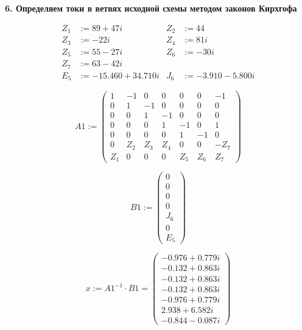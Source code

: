 \documentclass{article}
\begin{document}
\textbf{6. Определяем токи в ветвях исходной схемы методом законов Кирхгофа}

\begin{align*}
Z_1 &:= 89 + 47i & Z_2 &:= 44 \\
Z_3 &:= -22i & Z_4 &:= 81i \\
Z_5 &:= 55 - 27i & Z_6 &:= -30i \\
Z_7 &:= 63 - 42i \\
E_5 &:= -15.460 + 34.710i & J_6 &:= -3.910 - 5.800i
\end{align*}

\[
A1 := \begin{pmatrix} 
1 & -1 & 0 & 0 & 0 & 0 & -1 \\ 
0 & 1 & -1 & 0 & 0 & 0 & 0 \\ 
0 & 0 & 1 & -1 & 0 & 0 & 0 \\ 
0 & 0 & 0 & 1 & -1 & 0 & 1 \\ 
0 & 0 & 0 & 0 & 1 & -1 & 0 \\ 
0 & Z_2 & Z_3 & Z_4 & 0 & 0 & -Z_7 \\ 
Z_1 & 0 & 0 & 0 & Z_5 & Z_6 & Z_7 
\end{pmatrix}
\]

\[
B1 := \begin{pmatrix} 0 \\ 0 \\ 0 \\ 0 \\ J_6 \\ 0 \\ E_5 \end{pmatrix}
\]

\[
x := A1^{-1} \cdot B1 = \begin{pmatrix} 
-0.976 + 0.779i \\ 
-0.132 + 0.863i \\ 
-0.132 + 0.863i \\ 
-0.132 + 0.863i \\ 
-0.976 + 0.779i \\ 
2.938 + 6.582i \\ 
-0.844 - 0.087i 
\end{pmatrix}
\]
\end{document}
